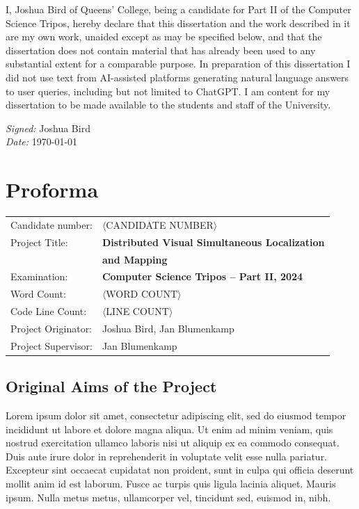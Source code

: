 \documentclass[12pt,a4paper,twoside,openright]{report}
\begin{document}
I, Joshua Bird of Queens' College, being a candidate for Part II of the Computer Science Tripos, hereby declare that this dissertation and the work described in it are my own work, unaided except as may be specified below, and that the dissertation does not contain material that has already been used to any substantial extent for a comparable purpose. In preparation of this dissertation I did not use text from AI-assisted platforms generating natural language answers to user queries, including but not limited to ChatGPT. I am content for my dissertation to be made available to the students and staff of the University.

\emph{Signed:} Joshua Bird\\
\emph{Date:} \today

\chapter*{Proforma}
 {\large
  \begin{tabular}{ll}
	  Candidate number:   & \(\langle\)CANDIDATE NUMBER\(\rangle\)           \\
	  Project Title:      & \bf Distributed Visual Simultaneous Localization \\
	                      & \bf and Mapping                                  \\
	  Examination:        & \bf Computer Science Tripos -- Part II, 2024     \\
	  Word Count:         & \(\langle\)WORD COUNT\(\rangle\)\footnotemark[1] \\
	  Code Line Count:    & \(\langle\)LINE COUNT\(\rangle\)\footnotemark[2] \\
	  Project Originator: & Joshua Bird, Jan Blumenkamp                      \\
	  Project Supervisor: & Jan Blumenkamp                                   \\
  \end{tabular}
 }

\section*{Original Aims of the Project}

Lorem ipsum dolor sit amet, consectetur adipiscing elit, sed do eiusmod tempor incididunt ut labore et dolore magna aliqua. Ut enim ad minim veniam, quis nostrud exercitation ullamco laboris nisi ut aliquip ex ea commodo consequat. Duis aute irure dolor in reprehenderit in voluptate velit esse nulla pariatur. Excepteur sint occaecat cupidatat non proident, sunt in culpa qui officia deserunt mollit anim id est laborum.
Fusce ac turpis quis ligula lacinia aliquet. Mauris ipsum. Nulla metus metus, ullamcorper vel, tincidunt sed, euismod in, nibh.
\end{document}
